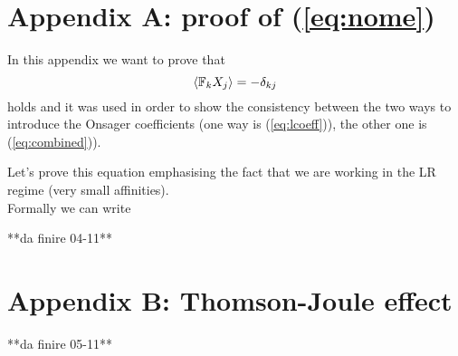 \documentclass[\main/main.tex]{subfiles}
\begin{document}
\section*{Appendix A: proof of (\ref{eq:nome})}
In this appendix we want to prove that
\begin{equation}
    \left\langle \mathbb{F}_kX_j \right\rangle=-\delta_{kj}
\end{equation}
holds and it was used in order to show the consistency between the two ways to introduce the Onsager coefficients (one way is (\ref{eq:lcoeff})), the other one is (\ref{eq:combined})).

Let's prove this equation emphasising the fact that we are working in the LR regime (very small affinities). \\

Formally we can write 

    **da finire 04-11**


\section*{Appendix B: Thomson-Joule effect}
\label{thomson}


    **da finire 05-11**
\end{document}
